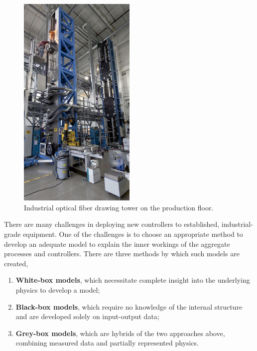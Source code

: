 \begin{figure}[hb!]
    \centering
    \includegraphics[width=0.5\textwidth]{figures/tower.png}
    \caption{Industrial optical fiber drawing tower on the production floor.}
    \label{fig:tower}
\end{figure}

There are many challenges in deploying new controllers to established, industrial-grade equipment. One of the challenges is to choose an appropriate method to develop an adequate model to explain the inner workings of the aggregate processes and controllers. There are three methods by which such models are created, 
\begin{enumerate}
    \item \textbf{White-box models}, which necessitate complete insight into the underlying physics to develop a model; 
    \item \textbf{Black-box models}, which require no knowledge of the internal structure and are developed solely on input-output data;
    \item \textbf{Grey-box models}, which are hybrids of the two approaches above, combining measured data and partially represented physics.
\end{enumerate}

